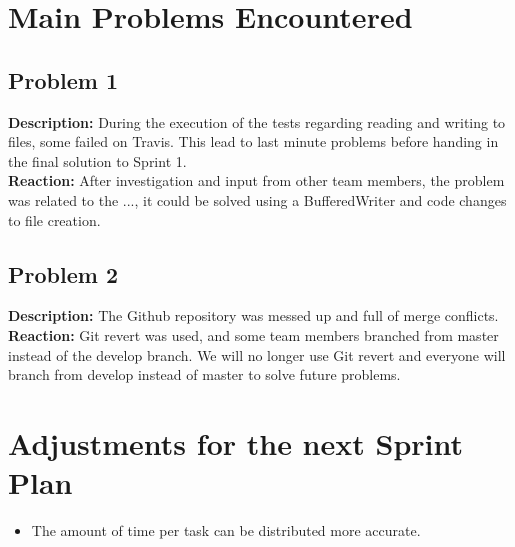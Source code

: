 \documentclass[10pt]{article}
\begin{document}
\section*{Main Problems Encountered}
\subsection*{Problem 1}
\textbf{Description:}
During the execution of the tests regarding reading and writing to files, some failed on Travis. This lead to last minute problems before handing in the final solution to Sprint 1.\\
\textbf{Reaction:} 
After investigation and input from other team members, the problem was related to the ..., it could be solved using a BufferedWriter and code changes to file creation.

\subsection*{Problem 2}
\textbf{Description:}
The Github repository was messed up and full of merge conflicts.\\
\textbf{Reaction:} 
Git revert was used, and some team members branched from master instead of the develop branch.
We will no longer use Git revert and everyone will branch from develop instead of master to solve future problems.

\section*{Adjustments for the next Sprint Plan}
\begin{itemize}
\item The amount of time per task can be distributed more accurate.
\end{itemize}
\end{document}

